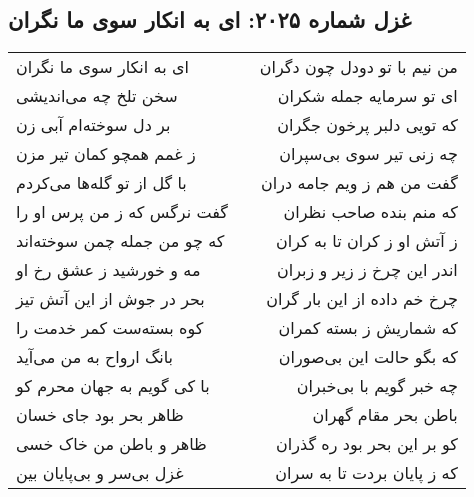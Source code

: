 \begin{center}
\section*{غزل شماره ۲۰۲۵: ای به انکار سوی ما نگران}
\label{sec:2025}
\begin{longtable}{l p{0.5cm} r}
ای به انکار سوی ما نگران
&&
من نیم با تو دودل چون دگران
\\
سخن تلخ چه می‌اندیشی
&&
ای تو سرمایه جمله شکران
\\
بر دل سوخته‌ام آبی زن
&&
که تویی دلبر پرخون جگران
\\
ز غمم همچو کمان تیر مزن
&&
چه زنی تیر سوی بی‌سپران
\\
با گل از تو گله‌ها می‌کردم
&&
گفت من هم ز ویم جامه دران
\\
گفت نرگس که ز من پرس او را
&&
که منم بنده صاحب نظران
\\
که چو من جمله چمن سوخته‌اند
&&
ز آتش او ز کران تا به کران
\\
مه و خورشید ز عشق رخ او
&&
اندر این چرخ ز زیر و زبران
\\
بحر در جوش از این آتش تیز
&&
چرخ خم داده از این بار گران
\\
کوه بسته‌ست کمر خدمت را
&&
که شماریش ز بسته کمران
\\
بانگ ارواح به من می‌آید
&&
که بگو حالت این بی‌صوران
\\
با کی گویم به جهان محرم کو
&&
چه خبر گویم با بی‌خبران
\\
ظاهر بحر بود جای خسان
&&
باطن بحر مقام گهران
\\
ظاهر و باطن من خاک خسی
&&
کو بر این بحر بود ره گذران
\\
غزل بی‌سر و بی‌پایان بین
&&
که ز پایان بردت تا به سران
\\
\end{longtable}
\end{center}
